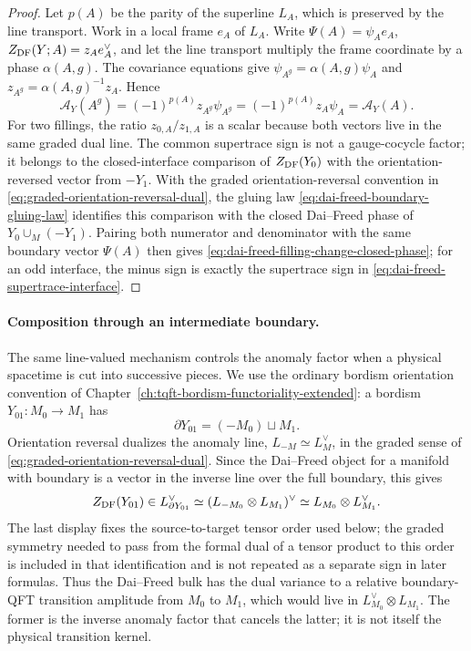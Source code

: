 \begin{proof}
Let \(p(A)\) be the parity of the superline \(L_A\), which is preserved by
the line transport.  Work in a local frame \(e_A\) of \(L_A\).  Write
\(\Psi(A)=\psi_A e_A\), \(Z_{\rm DF}(Y;A)=z_A e_A^\vee\), and let the line
transport multiply the frame coordinate by a phase \(\alpha(A,g)\).  The
covariance equations give
\(\psi_{A^g}=\alpha(A,g)\psi_A\) and
\(z_{A^g}=\alpha(A,g)^{-1}z_A\).  Hence
\[
  \mathcal A_Y(A^g)
  =
  (-1)^{p(A)}z_{A^g}\psi_{A^g}
  =
  (-1)^{p(A)}z_A\psi_A
  =
  \mathcal A_Y(A).
\]
For two fillings, the ratio \(z_{0,A}/z_{1,A}\) is a scalar because both
vectors live in the same graded dual line.  The common supertrace sign
is not a gauge-cocycle factor; it belongs to the closed-interface comparison
of \(Z_{\rm DF}(Y_0)\) with the orientation-reversed vector from
\(-Y_1\).  With the graded orientation-reversal convention in
\eqref{eq:graded-orientation-reversal-dual}, the gluing law
\eqref{eq:dai-freed-boundary-gluing-law} identifies this comparison with the
closed Dai--Freed phase of \(Y_0\cup_M(-Y_1)\).  Pairing both numerator and
denominator with the same boundary vector \(\Psi(A)\) then gives
\eqref{eq:dai-freed-filling-change-closed-phase}; for an odd interface, the
minus sign is exactly the supertrace sign in
\eqref{eq:dai-freed-supertrace-interface}.
\end{proof}

\paragraph{Composition through an intermediate boundary.}
The same line-valued mechanism controls the anomaly factor when a physical
spacetime is cut into successive pieces.  We use the ordinary bordism
orientation convention of Chapter~\ref{ch:tqft-bordism-functoriality-extended}:
a bordism \(Y_{01}:M_0\to M_1\) has
\[
  \partial Y_{01}=(-M_0)\sqcup M_1 .
\]
Orientation reversal dualizes the anomaly line,
\(L_{-M}\simeq L_M^\vee\), in the graded sense of
\eqref{eq:graded-orientation-reversal-dual}.  Since the Dai--Freed object
for a manifold with boundary is a vector in the inverse line over the full
boundary, this gives
\[
  Z_{\rm DF}(Y_{01})
  \in
  L_{\partial Y_{01}}^\vee
  \simeq
  (L_{-M_0}\otimes L_{M_1})^\vee
  \simeq
  L_{M_0}\otimes L_{M_1}^\vee .
\]
The last display fixes the source-to-target tensor order used below; the
graded symmetry needed to pass from the formal dual of a tensor product to
this order is included in that identification and is not repeated as a
separate sign in later formulas.
Thus the Dai--Freed bulk has the dual variance to a relative boundary-QFT
transition amplitude from \(M_0\) to \(M_1\), which would live in
\(L_{M_0}^\vee\otimes L_{M_1}\).  The former is the inverse anomaly factor
that cancels the latter; it is not itself the physical transition kernel.


